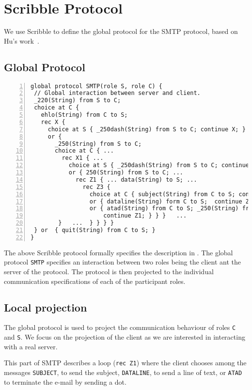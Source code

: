 \section{Scribble Protocol}
\label{sec: smtp_scribble}

We use Scribble to define the global
protocol for the SMTP protocol, based
on Hu's work~\cite{HuR:smtp}.

\subsection{Global Protocol}
\label{sec: smtp_global}

%
\begin{lstlisting}[numbers=left]
global protocol SMTP(role S, role C) {
 // Global interaction between server and client.
 _220(String) from S to C;
 choice at C {
   ehlo(String) from C to S;
   rec X {
     choice at S { _250dash(String) from S to C; continue X; }
     or {
       _250(String) from S to C;
       choice at C { ...
         rec X1 { ...
           choice at S { _250dash(String) from S to C; continue X1; }
           or { 250(String) from S to C; ... 
             rec Z1 { ... data(String) to S; ...
               rec Z3 {
                 choice at C { subject(String) from C to S; continue Z3; }
                 or { dataline(String) form C to S;  continue Z3; }
                 or { atad(String) from C to S; _250(String) from S to C; 
                     continue Z1; } } }   ...
        }   ...  } } } }
 } or  { quit(String) from C to S; }
}
\end{lstlisting}


The above Scribble protocol formally specifies
the description in .
The global protocol \lstinline|SMTP| specifies
an interaction between two roles being the client ant the server of the protocol.
The protocol is then projected to the
individual communication specifications of each 
of the participant roles.


\subsection{Local projection}
\label{subsec: smtp_local}

The global protocol is used to project the communication
behaviour of roles \lstinline|C| and \lstinline|S|.
We focus on the projection of the client as we are interested in interacting with a real server.

This part of SMTP describes a loop (\lstinline|rec Z1|) where the client chooses
among the messages \lstinline|SUBJECT|, to send the subject,
\lstinline|DATALINE|, to send a line of text, or \lstinline|ATAD| to terminate the e-mail by sending a dot.

